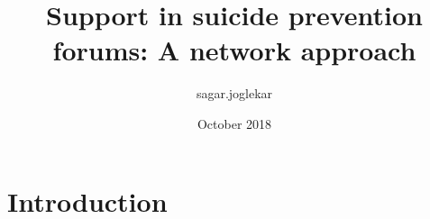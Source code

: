\documentclass{article}
\title{Support in suicide prevention forums: A network approach}
\author{sagar.joglekar }
\date{October 2018}
\begin{document}
\maketitle

\section{Introduction}
\end{document}
